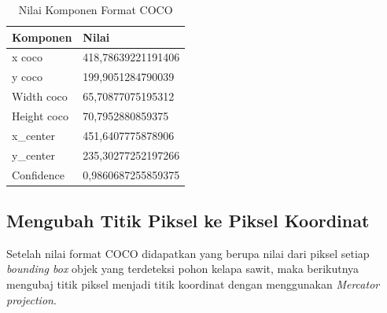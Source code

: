 \begin{singlespace}
	\begin{table}[H]
		\centering
		\caption{Nilai Komponen Format COCO}
		\label{tbl:Nilai-Komponen-Format-COCO}
		\begin{tabular}{|m{2cm}|m{8cm}|}
			\hline
			\rowcolor[HTML]{D9D9D9} 
			Komponen    & Nilai              \\ \hline
			x coco      & 418,78639221191406 \\ \hline
			y coco      & 199,9051284790039  \\ \hline
			Width coco  & 65,70877075195312  \\ \hline
			Height coco & 70,7952880859375   \\ \hline
			x\_center   & 451,6407775878906  \\ \hline
			y\_center   & 235,30277252197266 \\ \hline
			Confidence  & 0,9860687255859375 \\ \hline
		\end{tabular}
	\end{table}
\end{singlespace}

\subsection{Mengubah Titik Piksel ke Piksel Koordinat}
\hspace{1,2cm}
Setelah nilai format COCO didapatkan yang berupa nilai dari piksel setiap \textit{bounding box} objek yang terdeteksi pohon kelapa sawit, maka berikutnya mengubaj titik piksel menjadi titik koordinat dengan menggunakan \textit{Mercator projection}.

